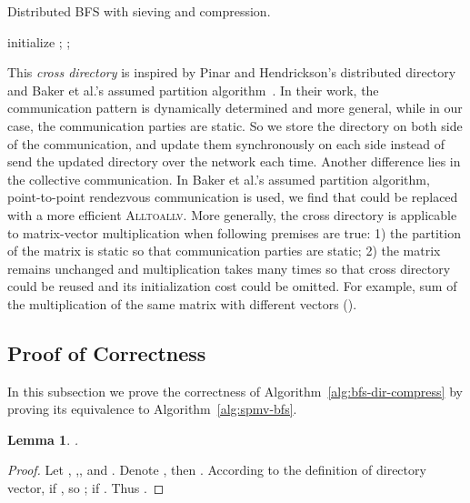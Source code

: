 \documentclass[conference]{IEEEtran}
\newtheorem{lemma}[theorem]{Lemma}
\begin{document}
\begin{algorithm} [t] \label{alg:bfs-dir-compress}
\caption{Distributed BFS with sieving and compression.}
\;
initialize \;
{
  \While{}
  {
    \;
    \;
    ; \;
    {
      ;\;
      \;
    }
    \;
    {
      \;
    }
  }
}
\end{algorithm}

This \textit{cross directory} is inspired by Pinar and Hendrickson's
distributed directory~\cite{Pinar:2001} and Baker et al.'s assumed partition
algorithm~\cite{Baker:2006}. In their work, the communication pattern is
dynamically determined and more general, while in our case, the communication
parties are static. So we store the directory on both side of the
communication, and update them synchronously on each side instead of send the
updated directory over the network each time.  Another difference lies in the
collective communication. In Baker et al.'s assumed partition algorithm,
point-to-point rendezvous communication is used, we find that could be
replaced with a more efficient \textsc{Alltoallv}. More generally, the cross
directory is applicable to matrix-vector multiplication when following
premises are true: 1) the partition of the matrix is static so that
communication parties are static; 2) the matrix remains unchanged and
multiplication takes many times so that cross directory could be reused and
its initialization cost could be omitted. For example, sum of the
multiplication of the same matrix with different vectors
().

\subsection{Proof of Correctness}
\label{sec:prof-correct}

In this subsection we prove the correctness of
Algorithm~\ref{alg:bfs-dir-compress} by proving its equivalence to
Algorithm~\ref{alg:spmv-bfs}.

\begin{lemma}\label{lemma-1}
  .
\end{lemma}
\begin{proof}
  Let ,
  ,, and
  . Denote , then
  . According to the definition of directory
  vector, if , so ; if . Thus .
\end{proof}
\end{document}
